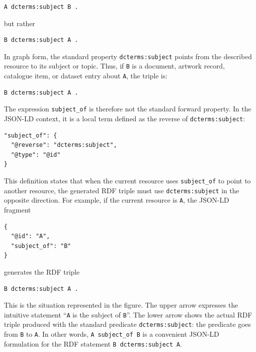 \documentclass{scrbook}
\begin{document}
	\begin{lstlisting}
A dcterms:subject B .
	\end{lstlisting}
	
	but rather
	
	\begin{lstlisting}
B dcterms:subject A .
	\end{lstlisting}
	
	In graph form, the standard property \texttt{dcterms:subject} points from the described resource to its subject or topic. Thus, if \texttt{B} is a document, artwork record, catalogue item, or dataset entry about \texttt{A}, the triple is:
	
	\begin{lstlisting}
B dcterms:subject A .
	\end{lstlisting}
	
	The expression \texttt{subject\_of} is therefore not the standard forward property. In the JSON-LD context, it is a local term defined as the reverse of \texttt{dcterms:subject}:
	
	\begin{lstlisting}
"subject_of": {
  "@reverse": "dcterms:subject",
  "@type": "@id"
}
	\end{lstlisting}
	
	This definition states that when the current resource uses \texttt{subject\_of} to point to another resource, the generated RDF triple must use \texttt{dcterms:subject} in the opposite direction. For example, if the current resource is \texttt{A}, the JSON-LD fragment
	
	\begin{lstlisting}
{
  "@id": "A",
  "subject_of": "B"
}
	\end{lstlisting}
	
	generates the RDF triple
	
	\begin{lstlisting}
B dcterms:subject A .
	\end{lstlisting}
	
	This is the situation represented in the figure. The upper arrow expresses the intuitive statement ``\texttt{A} is the subject of \texttt{B}''. The lower arrow shows the actual RDF triple produced with the standard predicate \texttt{dcterms:subject}: the predicate goes from \texttt{B} to \texttt{A}. In other words, \texttt{A subject\_of B} is a convenient JSON-LD formulation for the RDF statement \texttt{B dcterms:subject A}.\\
	
\end{document}
